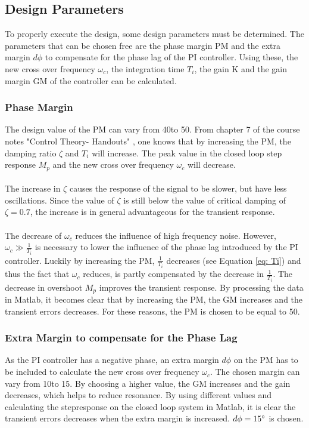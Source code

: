 \documentclass[a4paper,kul]{kulakarticle} %
\begin{document}
\subsection{Design Parameters}
To properly execute the design, some design parameters must be determined. The parameters that can be chosen free are the phase margin PM and the extra margin $d\phi$ to compensate for the phase lag of the PI controller. Using these, the new cross over frequency $\omega_c$, the integration time $T_i$, the gain K and the gain margin GM of the controller can be calculated. 



\subsubsection{Phase Margin}
The design value of the PM can vary from 40\degree to 50\degree. From chapter 7 of the course notes "Control Theory- Handouts" \cite{slidescontroltheory}, one knows that by increasing the PM, the damping ratio $\zeta$ and $T_i$ will increase. The peak value in the closed loop step response $M_p$ and the new cross over frequency $\omega_c$ will decrease.
\\\\
 The increase in $\zeta$ causes the response of the signal to be slower, but have less oscillations. Since the value of $\zeta$ is still below the value of critical damping of $\zeta = 0.7$, the increase is in general advantageous for the transient response. 
 \\\\
 The decrease of $\omega_c$ %
 reduces the influence of high frequency noise. However, $\omega_c \gg \frac{1}{T_i}$ is necessary to lower the influence of the phase lag introduced by the PI controller. Luckily by increasing the PM, $\frac{1}{T_i}$ decreases (see Equation \ref{eq: Ti}) and thus the fact that $\omega_c$ reduces, is partly compensated by the decrease in $\frac{1}{T_i}$. The decrease in overshoot $M_p$ improves the transient response. By processing the data in Matlab, it becomes clear that by increasing the PM, the GM increases and the transient errors decreases. For these reasons, the PM is chosen to be equal to 50\degree. 

\subsubsection{Extra Margin to compensate for the Phase Lag}
	As the PI controller has a negative phase, an extra margin $d\phi$ on the PM has to be included to calculate the new cross over frequency $\omega_c$. The chosen margin can vary from 10\degree to 15\degree. By choosing a higher value, the GM increases and the gain decreases, which helps to reduce resonance. By using different values and calculating the stepresponse on the closed loop system in Matlab, it is clear the transient errors decreases when the extra margin is increased. $d\phi = 15\degree$ is chosen. 
\end{document}
